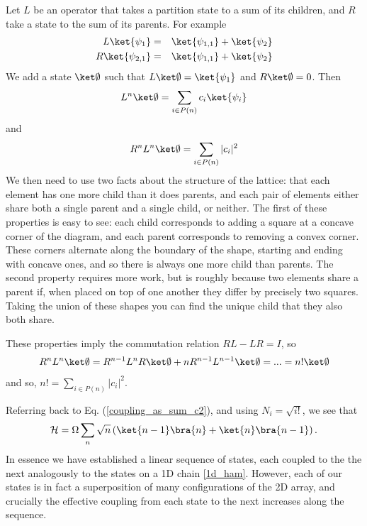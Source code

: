 Let $L$ be an operator that takes a partition state to a sum of its
children, and $R$ take a state to the sum of its parents. For example\begin{eqnarray*}
  L\ket{\psi_{1}} & = & \ket{\psi_{1,1}}+\ket{\psi_{2}}\\
  R\ket{\psi_{2,1}} & = & \ket{\psi_{1,1}}+\ket{\psi_{2}}\end{eqnarray*}
We add a state $\ket\emptyset$ such that $L\ket\emptyset=\ket{\psi_{1}}$
and $R\ket\emptyset=0$. Then
\begin{align}
  L^{n}\ket\emptyset=\sum_{i\in P(n)}c_{i}\ket{\psi_{i}}
\end{align}
and
\begin{align}
  R^{n}L^{n}\ket\emptyset=\sum_{i\in P(n)}|c_{i}|^{2}
\end{align}
We then need to use two facts about the structure of the lattice: that each element has one more child than it does parents, and each pair of elements either share both a single parent and a single child, or neither. The first of these properties is easy to see: each child corresponds to adding a square at a concave corner of the diagram, and each parent corresponds to removing a convex corner. These corners alternate along the boundary of the shape, starting and ending with concave ones, and so there is always one more child than parents.  The second property requires more work, but is roughly because two elements share a parent if, when placed on top of one another they differ by precisely two squares. Taking the union of these shapes you can find the unique child that they also both share.

These properties imply the commutation relation $RL-LR=I$, so
\begin{align}
  R^{n}L^{n}\ket\emptyset=R^{n-1}L^{n}R\ket\emptyset+nR^{n-1}L^{n-1}\ket\emptyset=...=n!\ket\emptyset
\end{align}
and so, $n!=\sum_{i\in P(n)}|c_{i}|^{2}$.

Referring back to Eq. (\ref{coupling_as_sum_c2}), and using $N_i=\sqrt{i!}$, we see that
\begin{equation}
  {\cal{H}} = \Omega \sum_{n} \sqrt{n} \left( \ket{n-1} \bra{n} +
  \ket{n} \bra{n-1} \right) .
  \label{2d_ham}
\end{equation}
In essence we have established a linear sequence of states, each coupled to the the next analogously to the states on a 1D chain \ref{1d_ham}. However, each of our states is in fact a superposition of many configurations of the 2D array, and crucially the effective coupling from each state to the next increases along the sequence.

